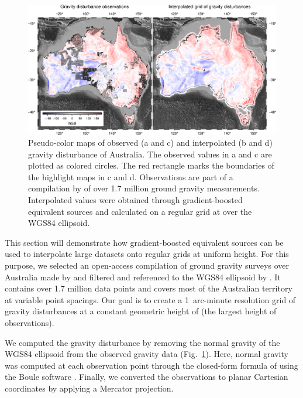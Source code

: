 \begin{figure}
    \includegraphics[width=\linewidth]{figs/australia.png}
    \caption{
      Pseudo-color maps of observed (a and c) and
      interpolated (b and d) gravity disturbance of Australia.
      The observed values in a and c are plotted as colored circles.
      The red rectangle marks the boundaries of the highlight maps in c
      and d.
      Observations are part of a compilation by \citet{wynne2018} of
      over 1.7 million ground gravity measurements.
      Interpolated values were obtained through gradient-boosted equivalent
      sources and calculated on a regular grid at \AustraliaEqlGridHeight{}
      over the WGS84 ellipsoid.
    }
    \label{fig:australia}
\end{figure}

This section will demonstrate how gradient-boosted equivalent sources can be
used to interpolate large datasets onto regular grids at uniform height.
For this purpose, we selected an open-access compilation of ground gravity
surveys over Australia made by \citet{wynne2018} and filtered and referenced to
the WGS84 ellipsoid by \citet{australia_compilation}.
It contains over 1.7 million data points and covers most of the Australian
territory at variable point spacings.
Our goal is to create a 1~arc-minute resolution grid of gravity disturbances at
a constant geometric height of \AustraliaEqlGridHeight{} (the largest height of
observations).

We computed the gravity disturbance by removing the normal gravity of
the WGS84 ellipsoid from the observed gravity data (Fig.~\ref{fig:australia}).
Here, normal gravity was computed at each observation point through the
closed-form formula of \citet{ligotze2001} using the Boule software
\citep{boule2020}.
Finally, we converted the observations to planar Cartesian coordinates by
applying a Mercator projection.

